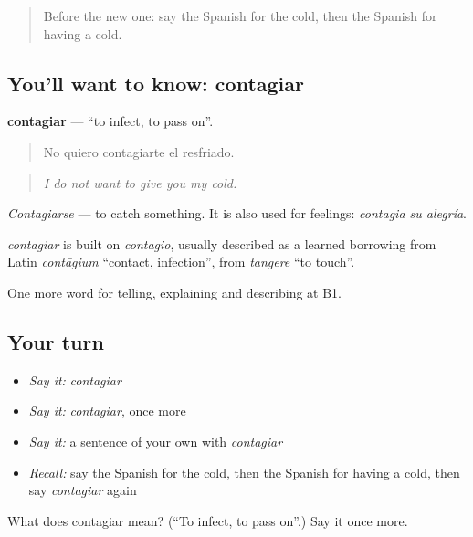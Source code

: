 \begin{quote}
Before the new one: say the Spanish for the cold, then the Spanish for having a cold.
\end{quote}

\subsection*{You'll want to know: contagiar}
\textbf{contagiar} — \textquotedblleft{}to infect, to pass on\textquotedblright{}.

\begin{quote}
No quiero contagiarte el resfriado.
\end{quote}

\begin{quote}
\emph{I do not want to give you my cold.}
\end{quote}

\emph{Contagiarse} — to catch something. It is also used for feelings: \emph{contagia su alegría}.

\begin{cousinweb}
\emph{contagiar} is built on \emph{contagio}, usually described as a learned borrowing from Latin \emph{contāgium} \textquotedblleft{}contact, infection\textquotedblright{}, from \emph{tangere} \textquotedblleft{}to touch\textquotedblright{}.
\end{cousinweb}

\begin{grammarlens}[title={What you've built}]
One more word for telling, explaining and describing at B1.
\end{grammarlens}

\subsection*{Your turn}
\begin{itemize}
\raggedright
  \item \emph{Say it:} \emph{contagiar}
  \item \emph{Say it:} \emph{contagiar}, once more
  \item \emph{Say it:} a sentence of your own with \emph{contagiar}
  \item \emph{Recall:} say the Spanish for the cold, then the Spanish for having a cold, then say \emph{contagiar} again
\end{itemize}

\begin{tcolorbox}[breakable,colback=teal!4,colframe=teal!35!black,title={Before you move on}]
What does contagiar mean? (\textquotedblleft{}To infect, to pass on\textquotedblright{}.) Say it once more.
\end{tcolorbox}
